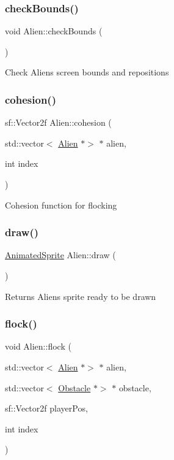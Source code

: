 \subsubsection{\texorpdfstring{check\+Bounds()}{checkBounds()}}
{\footnotesize\ttfamily void Alien\+::check\+Bounds (\begin{DoxyParamCaption}{ }\end{DoxyParamCaption})}

Check Aliens screen bounds and repositions \mbox{\label{class_alien_ad84aef6c1b05152acbed764aaf457442}} 
\subsubsection{\texorpdfstring{cohesion()}{cohesion()}}
{\footnotesize\ttfamily sf\+::\+Vector2f Alien\+::cohesion (\begin{DoxyParamCaption}\item[{std\+::vector$<$ \hyperlink{class_alien}{Alien} $\ast$$>$ $\ast$}]{alien,  }\item[{int}]{index }\end{DoxyParamCaption})}

Cohesion function for flocking \mbox{\label{class_alien_a518e51803e638c46d0452ba283f2aad6}} 
\subsubsection{\texorpdfstring{draw()}{draw()}}
{\footnotesize\ttfamily \hyperlink{class_animated_sprite}{Animated\+Sprite} Alien\+::draw (\begin{DoxyParamCaption}{ }\end{DoxyParamCaption})}

Returns Aliens sprite ready to be drawn \mbox{\label{class_alien_a051e049fc66e47ff7ddf7bd2338b92a5}} 
\subsubsection{\texorpdfstring{flock()}{flock()}}
{\footnotesize\ttfamily void Alien\+::flock (\begin{DoxyParamCaption}\item[{std\+::vector$<$ \hyperlink{class_alien}{Alien} $\ast$$>$ $\ast$}]{alien,  }\item[{std\+::vector$<$ \hyperlink{class_obstacle}{Obstacle} $\ast$$>$ $\ast$}]{obstacle,  }\item[{sf\+::\+Vector2f}]{player\+Pos,  }\item[{int}]{index }\end{DoxyParamCaption})}

